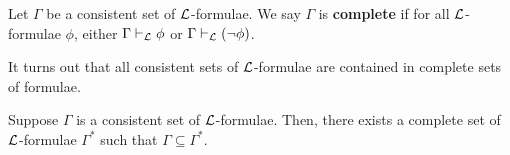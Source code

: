 \begin{boxdefinition}[Completeness]\label{Ch1:Def:Complete}
    Let $\Gamma$ be a consistent set of $\mathcal{L}$-formulae. We say $\Gamma$ is \textbf{complete} if for all $\mathcal{L}$-formulae $\phi$, either $\Gamma \vdash_{\mathcal{L}} \phi$ or $\Gamma \vdash_{\mathcal{L}} \left( \neg \phi \right)$.
\end{boxdefinition}

It turns out that all consistent sets of $\mathcal{L}$-formulae are contained in complete sets of formulae.

\begin{boxtheorem}\label{Ch1:Thm:Lindenbaum}
    Suppose $\Gamma$ is a consistent set of $\mathcal{L}$-formulae. Then, there exists a complete set of $\mathcal{L}$-formulae $\Gamma^*$ such that $\Gamma \subseteq \Gamma^*$.
\end{boxtheorem}
